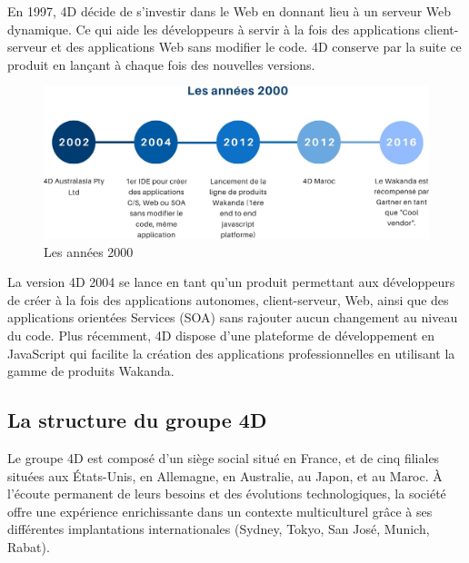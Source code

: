 En 1997, 4D décide de s’investir dans le Web en donnant lieu 
à un serveur Web dynamique. Ce qui aide les développeurs à servir
à la fois des applications client-serveur et des applications
Web sans modifier le code. 4D conserve par la suite ce produit 
en lançant à chaque fois des nouvelles versions.

\begin{figure}[h]
    \centering
    \includegraphics[scale=0.3]{Figures/20.jpg} %
    \caption{Les années 2000 \cite{4Dhistory}}
    \label{fig:Histoire90}
\end{figure}

La version 4D 2004 se lance en tant qu’un produit permettant aux développeurs 
de créer à la fois des applications autonomes, client-serveur, Web, 
ainsi que des applications orientées Services (SOA) sans rajouter 
aucun changement au niveau du code.
Plus récemment, 4D dispose d’une plateforme de développement 
en JavaScript qui facilite la création des applications 
professionnelles en utilisant la gamme de produits Wakanda.




\subsection{La structure du groupe 4D}

Le groupe 4D est composé d’un siège social situé en France, 
et de cinq filiales situées aux États-Unis, en Allemagne, 
en Australie, au Japon, et au Maroc. À l’écoute permanent 
de leurs besoins et des évolutions technologiques, 
la société offre une expérience enrichissante dans un contexte multiculturel grâce à ses différentes implantations internationales (Sydney, Tokyo, San José, Munich, Rabat).

\vspace{1cm}


